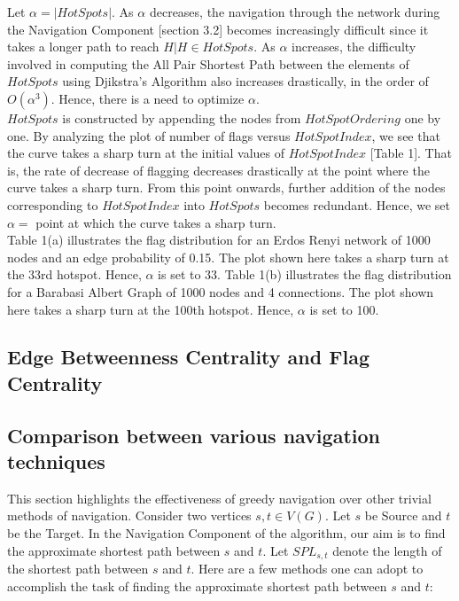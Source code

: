 \documentclass{article}
\begin{document}
Let $\alpha = |HotSpots|$. As $\alpha$ decreases, the navigation through the network during the Navigation Component [section 3.2] becomes increasingly difficult since it takes a longer path to reach $H | H \in HotSpots$. As $\alpha$ increases, the difficulty involved in computing the All Pair Shortest Path between the elements of $HotSpots$ using Djikstra's Algorithm also increases drastically, in the order of $O(\alpha^3)$. Hence, there is a need to optimize $\alpha$.\\

$HotSpots$ is constructed by appending the nodes from $HotSpotOrdering$ one by one. By analyzing the plot of number of flags versus $HotSpotIndex$, we see that the curve takes a sharp turn at the initial values of $HotSpotIndex$ [Table 1]. That is, the rate of decrease of flagging decreases drastically at the point where the curve takes a sharp turn. From this point onwards, further addition of the nodes corresponding to $HotSpotIndex$ into $HotSpots$ becomes redundant. Hence, we set\\
$\alpha =$ point at which the curve takes a sharp turn.\\

Table 1(a) illustrates the flag distribution for an Erdos Renyi network of 1000 nodes and an edge probability of 0.15. The plot shown here takes a sharp turn at the 33rd hotspot. Hence, $\alpha$ is set to 33.
Table 1(b) illustrates the flag distribution for a Barabasi Albert Graph of 1000 nodes and 4 connections. The plot shown here takes a sharp turn at the 100th hotspot. Hence, $\alpha$ is set to 100.\\

\subsection{Edge Betweenness Centrality and Flag Centrality}

\subsection{Comparison between various navigation techniques}

This section highlights the effectiveness of greedy navigation over other trivial methods of navigation. Consider two vertices $s,t \in V(G)$. Let $s$ be Source and $t$ be the Target. In the Navigation Component of the algorithm, our aim is to find the approximate shortest path between $s$ and $t$. Let $SPL_{s,t}$ denote the length of the shortest path between $s$ and $t$. Here are a few methods one can adopt to accomplish the task of finding the approximate shortest path between $s$ and $t$:\\
\end{document}
